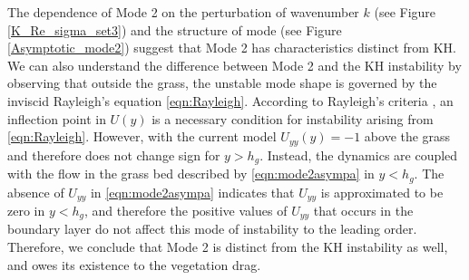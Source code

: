 \documentclass[12pt]{report}   %
\newcommand{\hg}{h_g}
\begin{document}
The dependence of Mode 2 on the perturbation of wavenumber $k$ (see Figure \ref{K_Re_sigma_set3}) and the structure of mode (see Figure \ref{Asymptotic_mode2}) suggest that Mode 2 has characteristics distinct from KH. We can also understand the difference between Mode 2 and the KH instability by observing that outside the grass, the unstable mode shape is governed by the inviscid Rayleigh's equation \eqref{eqn:Rayleigh}.
According to Rayleigh's criteria \cite{Rayleigh1879}, an inflection point in $U(y)$ is a necessary condition for instability arising from \eqref{eqn:Rayleigh}. However, with the current model $U_{yy}(y) = -1$ above the grass and therefore does not change sign for $y>\hg$. 
Instead, the dynamics are coupled with the flow in the grass bed described by \eqref{eqn:mode2asympa} in $y< \hg$.
The absence of $U_{yy}$ in \eqref{eqn:mode2asympa} indicates that $U_{yy}$ is approximated to be zero in $y<\hg$, and therefore the positive values of $U_{yy}$ that occurs in the boundary layer do not affect this mode of instability to the leading order.
Therefore, we conclude that Mode 2 is distinct from the KH instability as well, and owes its existence to the vegetation drag.
\end{document}
